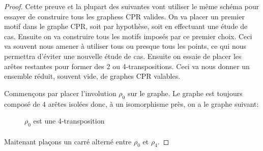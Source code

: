 \begin{proof}
  Cette preuve et la plupart des suivantes vont utiliser le même schéma pour essayer de construire tous les graphess CPR valides. On va placer un premier motif dans le graphe CPR, soit par hypothèse, soit en effectuant une étude de cas. Ensuite on va construire tous les motifs imposés par ce premier choix. Ceci va souvent nous amener à utiliser tous ou presque tous les points, ce qui nous permettra d'éviter une nouvelle étude de cas. Ensuite on essaie de placer les arêtes restantes pour former des 2 ou 4-transpositions. Ceci va nous donner un ensemble réduit, souvent vide, de graphes CPR valables.

  Commençons par placer l'involution $\rho_0$ sur le graphe. Le graphe est toujours composé de 4 arêtes isolées donc, à un isomorphisme près, on a le graphe suivant:

  \begin{figure}[H]
    \begin{center}
      \caption{$\rho_0$ est une 4-transposition}
    \end{center}
  \end{figure}

  \paragraph{}
  Maitenant plaçons un carré alterné entre $\rho_0$ et $\rho_4$.


\end{proof}
